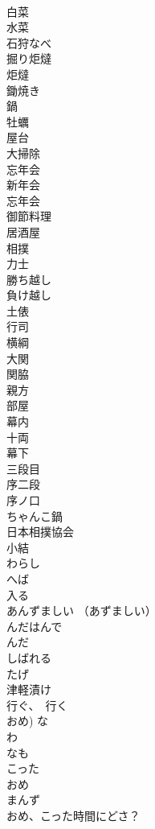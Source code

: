 \documentclass[8pt]{extreport}
\begin{document}
\begin{CJK}{UTF8}{min}
\\	白菜
\\	水菜
\\	石狩なべ
\\	掘り炬燵
\\	炬燵
\\	鋤焼き
\\	鍋
\\	牡蠣
\\	屋台
\\	大掃除
\\	忘年会
\\	新年会
\\	忘年会
\\	御節料理
\\	居酒屋
\\	相撲
\\	力士
\\	勝ち越し
\\	負け越し
\\	土俵
\\	行司
\\	横綱
\\	大関
\\	関脇
\\	親方
\\	部屋
\\	幕内
\\	十両
\\	幕下
\\	三段目
\\	序二段
\\	序ノ口
\\	ちゃんこ鍋
\\	日本相撲協会
\\	小結
\\	わらし
\\	へば
\\	入る
\\	あんずましい （あずましい）
\\	んだはんで
\\	んだ
\\	しばれる
\\	たげ
\\	津軽漬け
\\	行ぐ、　行く
\\	おめ)	な
\\	わ
\\	なも
\\	こった
\\	おめ
\\	まんず
\\	おめ、こった時間にどさ？	

\end{CJK}
\end{document}
